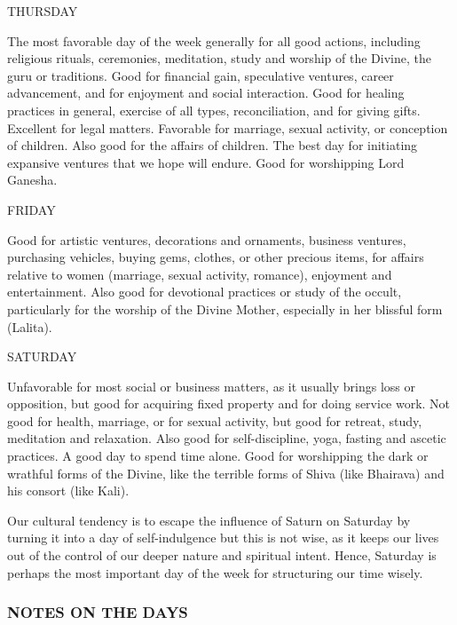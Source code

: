 \begin{enumerate}
 

THURSDAY

The most favorable day of the week generally for all good actions, including religious rituals, ceremonies, meditation, study and worship of the Divine, the guru or traditions. Good for financial gain, speculative ventures, career advancement, and for enjoyment and social interaction. Good for healing practices in general, exercise of all types, reconciliation, and for giving gifts. Excellent for legal matters. Favorable for marriage, sexual activity, or conception of children. Also good for the affairs of children. The best day for initiating expansive ventures that we hope will endure. Good for worshipping Lord Ganesha.

 

FRIDAY

Good for artistic ventures, decorations and ornaments, business ventures, purchasing vehicles, buying gems, clothes, or other precious items, for affairs relative to women (marriage, sexual activity, romance), enjoyment and entertainment. Also good for devotional practices or study of the occult, particularly for the worship of the Divine Mother, especially in her blissful form (Lalita).

 

SATURDAY

Unfavorable for most social or business matters, as it usually brings loss or opposition, but good for acquiring fixed property and for doing service work. Not good for health, marriage, or for sexual activity, but good for retreat, study, meditation and relaxation. Also good for self-discipline, yoga, fasting and ascetic practices. A good day to spend time alone. Good for worshipping the dark or wrathful forms of the Divine, like the terrible forms of Shiva (like Bhairava) and his consort (like Kali).

Our cultural tendency is to escape the influence of Saturn on Saturday by turning it into a day of self-indulgence but this is not wise, as it keeps our lives out of the control of our deeper nature and spiritual intent. Hence, Saturday is perhaps the most important day of the week for structuring our time wisely.

 

\subsubsection{NOTES ON THE DAYS}

 


\end{enumerate}
